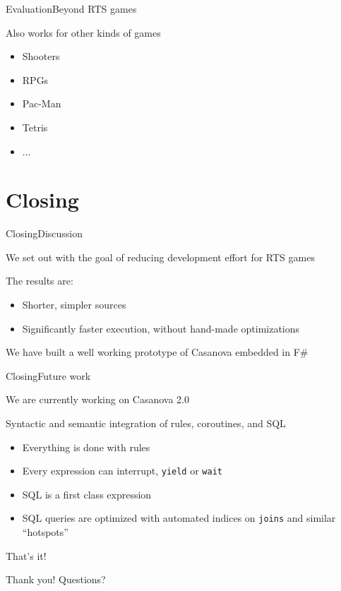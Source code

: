 \documentclass{beamer}
\begin{document}
\begin{slide}{Evaluation}{Beyond RTS games}{
\item Also works for other kinds of games
\begin{itemize}
\item Shooters
\item RPGs
\item Pac-Man
\item Tetris
\item ...
\end{itemize}
}\end{slide}

\section{Closing}
\begin{slide}{Closing}{Discussion}{
\item We set out with the goal of reducing development effort for RTS games
\item The results are:
\begin{itemize}
\item Shorter, simpler sources
\item Significantly faster execution, without hand-made optimizations
\end{itemize}
\item We have built a well working prototype of Casanova embedded in F\#
}\end{slide}

\begin{slide}{Closing}{Future work}{
\item We are currently working on Casanova 2.0
\item Syntactic and semantic integration of rules, coroutines, and SQL
\begin{itemize}
\item Everything is done with rules
\item Every expression can interrupt, \texttt{yield} or \texttt{wait}
\item SQL is a first class expression
\item SQL queries are optimized with automated indices on \texttt{joins} and similar ``hotspots''
\end{itemize}
}\end{slide}

\begin{frame}{That's it!}
\begin{block}{Thank you!}
Questions?
\end{block}
\end{frame}
\end{document}
